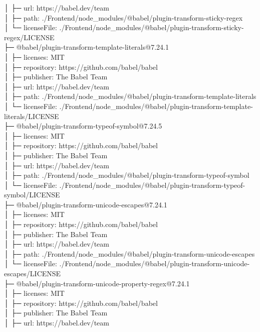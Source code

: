│  ├─ url: https://babel.dev/team\\
│  ├─ path: ./Frontend/node\_modules/@babel/plugin-transform-sticky-regex\\
│  └─ licenseFile: ./Frontend/node\_modules/@babel/plugin-transform-sticky-regex/LICENSE\\
├─ @babel/plugin-transform-template-literals@7.24.1\\
│  ├─ licenses: MIT\\
│  ├─ repository: https://github.com/babel/babel\\
│  ├─ publisher: The Babel Team\\
│  ├─ url: https://babel.dev/team\\
│  ├─ path: ./Frontend/node\_modules/@babel/plugin-transform-template-literals\\
│  └─ licenseFile: ./Frontend/node\_modules/@babel/plugin-transform-template-literals/LICENSE\\
├─ @babel/plugin-transform-typeof-symbol@7.24.5\\
│  ├─ licenses: MIT\\
│  ├─ repository: https://github.com/babel/babel\\
│  ├─ publisher: The Babel Team\\
│  ├─ url: https://babel.dev/team\\
│  ├─ path: ./Frontend/node\_modules/@babel/plugin-transform-typeof-symbol\\
│  └─ licenseFile: ./Frontend/node\_modules/@babel/plugin-transform-typeof-symbol/LICENSE\\
├─ @babel/plugin-transform-unicode-escapes@7.24.1\\
│  ├─ licenses: MIT\\
│  ├─ repository: https://github.com/babel/babel\\
│  ├─ publisher: The Babel Team\\
│  ├─ url: https://babel.dev/team\\
│  ├─ path: ./Frontend/node\_modules/@babel/plugin-transform-unicode-escapes\\
│  └─ licenseFile: ./Frontend/node\_modules/@babel/plugin-transform-unicode-escapes/LICENSE\\
├─ @babel/plugin-transform-unicode-property-regex@7.24.1\\
│  ├─ licenses: MIT\\
│  ├─ repository: https://github.com/babel/babel\\
│  ├─ publisher: The Babel Team\\
│  ├─ url: https://babel.dev/team\\
